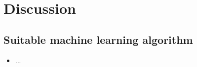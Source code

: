 \chapter{Discussion}

\section{Suitable machine learning algorithm }
    \begin{itemize}
        \item ...
    \end{itemize}


